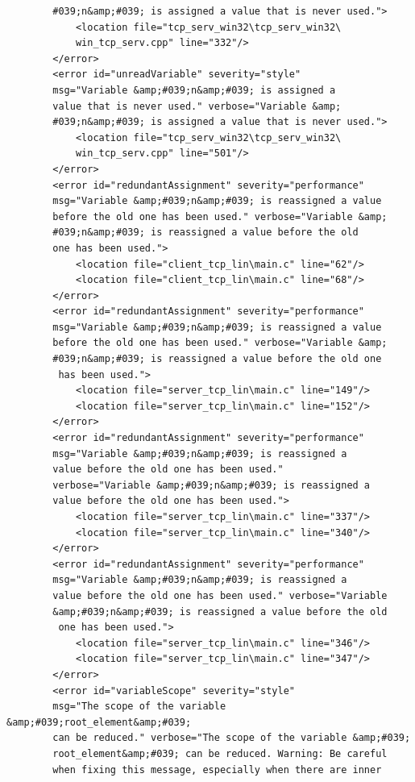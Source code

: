 \documentclass[10pt,a4paper]{report}
\begin{document}
\begin{lstlisting}
        #039;n&amp;#039; is assigned a value that is never used.">
            <location file="tcp_serv_win32\tcp_serv_win32\
            win_tcp_serv.cpp" line="332"/>
        </error>
        <error id="unreadVariable" severity="style" 
        msg="Variable &amp;#039;n&amp;#039; is assigned a 
        value that is never used." verbose="Variable &amp;
        #039;n&amp;#039; is assigned a value that is never used.">
            <location file="tcp_serv_win32\tcp_serv_win32\
            win_tcp_serv.cpp" line="501"/>
        </error>
        <error id="redundantAssignment" severity="performance" 
        msg="Variable &amp;#039;n&amp;#039; is reassigned a value 
        before the old one has been used." verbose="Variable &amp;
        #039;n&amp;#039; is reassigned a value before the old 
        one has been used.">
            <location file="client_tcp_lin\main.c" line="62"/>
            <location file="client_tcp_lin\main.c" line="68"/>
        </error>
        <error id="redundantAssignment" severity="performance" 
        msg="Variable &amp;#039;n&amp;#039; is reassigned a value 
        before the old one has been used." verbose="Variable &amp;
        #039;n&amp;#039; is reassigned a value before the old one
         has been used.">
            <location file="server_tcp_lin\main.c" line="149"/>
            <location file="server_tcp_lin\main.c" line="152"/>
        </error>
        <error id="redundantAssignment" severity="performance" 
        msg="Variable &amp;#039;n&amp;#039; is reassigned a 
        value before the old one has been used." 
        verbose="Variable &amp;#039;n&amp;#039; is reassigned a 
        value before the old one has been used.">
            <location file="server_tcp_lin\main.c" line="337"/>
            <location file="server_tcp_lin\main.c" line="340"/>
        </error>
        <error id="redundantAssignment" severity="performance" 
        msg="Variable &amp;#039;n&amp;#039; is reassigned a 
        value before the old one has been used." verbose="Variable 
        &amp;#039;n&amp;#039; is reassigned a value before the old
         one has been used.">
            <location file="server_tcp_lin\main.c" line="346"/>
            <location file="server_tcp_lin\main.c" line="347"/>
        </error>
        <error id="variableScope" severity="style" 
        msg="The scope of the variable &amp;#039;root_element&amp;#039; 
        can be reduced." verbose="The scope of the variable &amp;#039;
        root_element&amp;#039; can be reduced. Warning: Be careful 
        when fixing this message, especially when there are inner 

\end{lstlisting}
\end{document}
